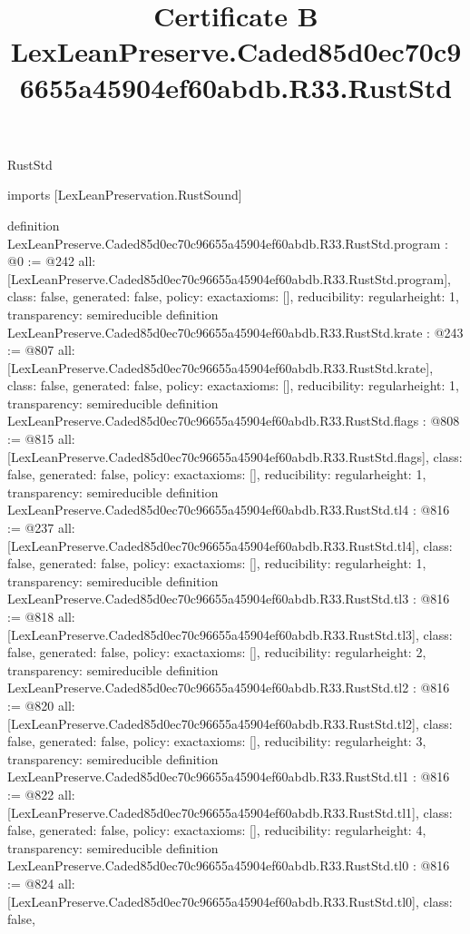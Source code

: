 \begin{lexlean}{RustStd}
\title{Certificate B LexLeanPreserve.Caded85d0ec70c96655a45904ef60abdb.R33.RustStd}
\begin{coremodule}
imports [LexLeanPreservation.RustSound]

definition LexLeanPreserve.Caded85d0ec70c96655a45904ef60abdb.R33.RustStd.program : @0 := @242 {
  all: [LexLeanPreserve.Caded85d0ec70c96655a45904ef60abdb.R33.RustStd.program],
  class: false,
  generated: false,
  policy: exact{axioms: []},
  reducibility: regular{height: 1},
  transparency: semireducible
}
definition LexLeanPreserve.Caded85d0ec70c96655a45904ef60abdb.R33.RustStd.krate : @243 := @807 {
  all: [LexLeanPreserve.Caded85d0ec70c96655a45904ef60abdb.R33.RustStd.krate],
  class: false,
  generated: false,
  policy: exact{axioms: []},
  reducibility: regular{height: 1},
  transparency: semireducible
}
definition LexLeanPreserve.Caded85d0ec70c96655a45904ef60abdb.R33.RustStd.flags : @808 := @815 {
  all: [LexLeanPreserve.Caded85d0ec70c96655a45904ef60abdb.R33.RustStd.flags],
  class: false,
  generated: false,
  policy: exact{axioms: []},
  reducibility: regular{height: 1},
  transparency: semireducible
}
definition LexLeanPreserve.Caded85d0ec70c96655a45904ef60abdb.R33.RustStd.tl4 : @816 := @237 {
  all: [LexLeanPreserve.Caded85d0ec70c96655a45904ef60abdb.R33.RustStd.tl4],
  class: false,
  generated: false,
  policy: exact{axioms: []},
  reducibility: regular{height: 1},
  transparency: semireducible
}
definition LexLeanPreserve.Caded85d0ec70c96655a45904ef60abdb.R33.RustStd.tl3 : @816 := @818 {
  all: [LexLeanPreserve.Caded85d0ec70c96655a45904ef60abdb.R33.RustStd.tl3],
  class: false,
  generated: false,
  policy: exact{axioms: []},
  reducibility: regular{height: 2},
  transparency: semireducible
}
definition LexLeanPreserve.Caded85d0ec70c96655a45904ef60abdb.R33.RustStd.tl2 : @816 := @820 {
  all: [LexLeanPreserve.Caded85d0ec70c96655a45904ef60abdb.R33.RustStd.tl2],
  class: false,
  generated: false,
  policy: exact{axioms: []},
  reducibility: regular{height: 3},
  transparency: semireducible
}
definition LexLeanPreserve.Caded85d0ec70c96655a45904ef60abdb.R33.RustStd.tl1 : @816 := @822 {
  all: [LexLeanPreserve.Caded85d0ec70c96655a45904ef60abdb.R33.RustStd.tl1],
  class: false,
  generated: false,
  policy: exact{axioms: []},
  reducibility: regular{height: 4},
  transparency: semireducible
}
definition LexLeanPreserve.Caded85d0ec70c96655a45904ef60abdb.R33.RustStd.tl0 : @816 := @824 {
  all: [LexLeanPreserve.Caded85d0ec70c96655a45904ef60abdb.R33.RustStd.tl0],
  class: false,
}
\end{coremodule}
\end{lexlean}
